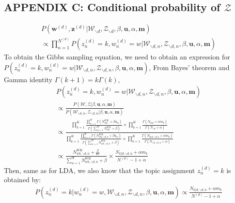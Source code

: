 \documentclass[a4paper]{article}
\begin{document}
  \subsection*{APPENDIX C: Conditional probability of $\mathcal{Z}$}
  \begin{equation}
  \begin{aligned}
  & P(\boldsymbol{w}^{(d)}, \boldsymbol{z}^{(d)}|\mathcal{W}_{\backslash d}, \mathcal{Z}_{\backslash d}, \beta, \boldsymbol{u}, \alpha, \boldsymbol{m}) \\& \propto \prod_{n=1}^{N^{(d)}}P(z^{(d)}_n=k, w^{(d)}_n=w| \mathcal{W}_{\backslash d, n}, \mathcal{Z}_{\backslash d, n}, \beta, \boldsymbol{u}, \alpha, \boldsymbol{m})
  \end{aligned}
  \end{equation} 
  To obtain the Gibbs sampling equation, we need to obtain an expression for $P(z^{(d)}_n=k,  w^{(d)}_n=w|\mathcal{W}_{\backslash d, n}, \mathcal{Z}_{\backslash d, n}, \beta, \boldsymbol{u}, \alpha, \boldsymbol{m})$,
  From Bayes' theorem and Gamma identity $\Gamma(k+1)=k\Gamma(k)$,
  \begin{equation}
  \begin{aligned}
  & P(z^{(d)}_n=k, w^{(d)}_n=w|\mathcal{W}_{\backslash d, n}, \mathcal{Z}_{\backslash d, n}, \beta, \boldsymbol{u}, \alpha, \boldsymbol{m}) \\& \propto 
  \frac{P(\mathcal{W}, \mathcal{Z}|\beta, \boldsymbol{u}, \alpha, \boldsymbol{m})}{P(\mathcal{W}_{\backslash d, n}, \mathcal{Z}_{\backslash d, n}|\beta, \boldsymbol{u}, \alpha, \boldsymbol{m})}\\& \propto \frac{\prod_{k=1}^{K}\frac{\prod_{w=1}^W\Gamma(N_{wk}^{WK}+\beta u_w)}{\Gamma(\sum_{w=1}^WN_{wk}^{WK}+\beta )}\times\prod_{k=1}^K\frac{\Gamma(N_{k|d}+\alpha m_k)}{\Gamma(N_{\cdot|d}+\alpha)}}{\prod_{k=1}^{K}\frac{\prod_{w=1}^W\Gamma(N_{wk, \backslash d, n}^{WK}+\beta u_w)}{\Gamma(\sum_{w=1}^WN_{wk, \backslash d, n}^{WK}+\beta )}\times\prod_{k=1}^K\frac{\Gamma(N_{k|d, \backslash d, n}+\alpha m_k)}{\Gamma(N_{\cdot|d, \backslash d, n}+\alpha)}}\\ & \propto 
  \frac{N_{wk, \backslash d, n}^{WK}+\frac{\beta}{W}}{\sum_{w=1}^WN_{wk,  \backslash d, n}^{WK}+\beta}\times\frac{N_{k|d, \backslash d, n}+\alpha m_k}{N^{(d)}-1+\alpha}
  \end{aligned}
  \end{equation}
  Then, same as for LDA, we also know that the topic assignment $z_n^{(d)}=k$ is obtained by:
  \begin{equation}
  \begin{aligned}
  &P(z^{(d)}_n=k|w^{(d)}_n=w, \mathcal{W}_{\backslash d, n}, \mathcal{Z}_{\backslash d,n}, \beta, \boldsymbol{u}, \alpha, \boldsymbol{m}) \propto
  \frac{N_{k|d, \backslash d, n}+\alpha m_k}{N^{(d)}-1+\alpha}
  \end{aligned}
  \end{equation}
\end{document}
